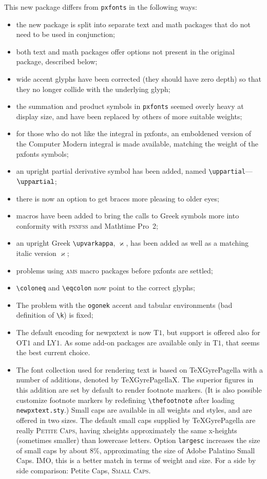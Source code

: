 \documentclass[11pt]{article}
\theoremstyle{oldplain}
\theoremstyle{plain}
\begin{document}
This new package differs from {\tt pxfonts} in the following ways:
\begin{itemize}
\item
the new package is split into separate text and math packages that do not need to be used in conjunction;
\item both text and math packages offer options not present in the original package, described below;\item wide accent glyphs have been corrected (they should have zero depth) so that they no longer collide with the underlying glyph;
\item the summation and product symbols in {\tt pxfonts} seemed overly heavy at display size, and have been replaced by others of more suitable weights;
\item for those who do not like the integral in \textsf{pxfonts}, an emboldened version of the Computer Modern integral is made available, matching the weight of the \textsf{pxfonts} symbols;
\item an upright partial derivative symbol has been added, named \verb|\uppartial|---$\uppartial$;
\item there is now an option to get braces more pleasing to older eyes;
\item macros have been added to bring the calls to Greek symbols more into conformity with \textsc{psnfss} and Mathtime Pro~2;
\item an upright Greek \verb|\upvarkappa|, $\upvarkappa$, has been added as well as a matching italic version $\varkappa$;
\item problems using \textsc{ams} macro packages before \textsf{pxfonts} are settled;
\item \verb|\coloneq| and \verb|\eqcolon| now point to the correct glyphs;
\item The problem with the {\tt ogonek} accent  and tabular environments (bad definition of \verb|\k|) is fixed;
\item The default encoding for \textsf{newpxtext} is now T$1$, but support is offered also for OT$1$ and LY$1$. As some add-on packages are available only in T$1$, that seems the best current choice.
\item The font collection used for rendering text is based on TeXGyrePagella with a number of additions, denoted by TeXGyrePagellaX. The superior figures in this addition are set by default to render footnote markers. (It is also possible customize footnote markers by redefining \verb|\thefootnote| after loading {\tt newpxtext.sty}.) Small caps are available in all weights and styles, and are offered in two sizes. The default small caps supplied by TeXGyrePagella are really \textsc{Petite Caps}, having xheights approximately the same x-heights (sometimes smaller) than lowercase letters. Option \texttt{largesc} increases the size of small caps by about 8\%, approximating the size of Adobe Palatino Small Caps. IMO, this is a better match in terms of weight and size. For a side by side comparison: {\pcf Petite Caps}, \textsc{Small Caps}.

\end{itemize}
\end{document}
